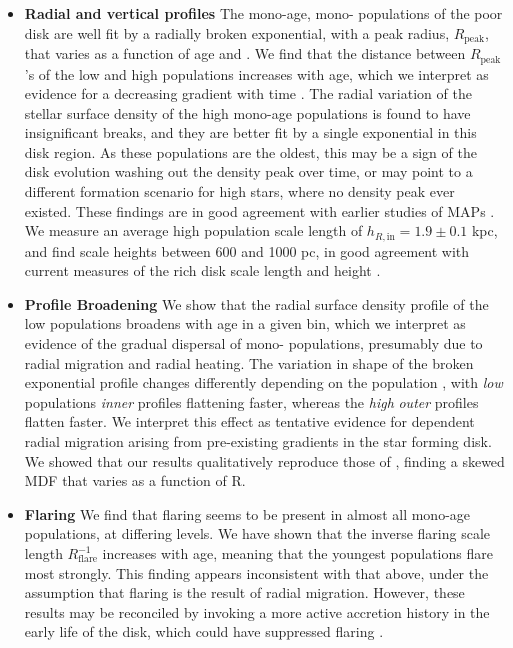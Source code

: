 \begin{itemize}
\item \textbf{Radial and vertical profiles} The mono-age, mono-\feh{} populations of the \afe{} poor disk are well fit by a radially broken exponential, with a peak radius, $R_{\mathrm{peak}}$, that varies as a function of age and \feh{}. We find that the distance between $R_{\mathrm{peak}}$'s of the low and high \feh{} populations increases with age, which we interpret as evidence for a decreasing \feh{} gradient with time \citep[e.g][]{2016arXiv160804951A}. The radial variation of the stellar surface density of the high \afe{} mono-age populations is found to have insignificant breaks, and they are better fit by a single exponential in this disk region. As these populations are the oldest, this may be a sign of the disk evolution washing out the density peak over time, or may point to a different formation scenario for high \afe{} stars, where no density peak ever existed. These findings are in good agreement with earlier studies of MAPs \citep{2016ApJ...823...30B}. We measure an average high \afe{} population scale length of $h_{R,\text{in}} = 1.9 \pm 0.1$ kpc, and find scale heights between 600 and 1000 pc, in good agreement with current measures of the \afe{} rich disk scale length and height \citep[e.g. those outlined in][]{2016ARA&A..54..529B}. 
\item \textbf{Profile Broadening} We show that the radial surface density profile of the low \afe{} populations broadens with age in a given \feh{} bin, which we interpret as evidence of the gradual dispersal of mono-\feh{} populations, presumably due to radial migration and radial heating. The variation in shape of the broken exponential profile changes differently depending on the population \feh{}, with \emph{low} \feh{} populations \emph{inner} profiles flattening faster, whereas the \emph{high} \feh{} \emph{outer} profiles flatten faster. We interpret this effect as tentative evidence for \feh{} dependent radial migration arising from pre-existing \feh{} gradients in the star forming disk. We showed that our results qualitatively reproduce those of \citet{2015ApJ...808..132H}, finding a skewed MDF that varies as a function of R.
\item \textbf{Flaring} We find that flaring seems to be present in almost all mono-age populations, at differing levels. We have shown that the inverse flaring scale length $R_{\mathrm{flare}}^{-1}$ increases with age, meaning that the youngest populations flare most strongly. This finding appears inconsistent with that above, under the assumption that flaring is the result of radial migration. However, these results may be reconciled by invoking a more active accretion history in the early life of the disk, which could have suppressed flaring \citep[e.g.][]{2014ApJ...781L..20M}.


\end{itemize}
